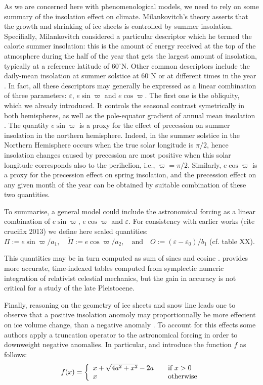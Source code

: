 \documentclass[a4paper,12pt]{article}
\newcommand{\degree}{\ensuremath{{}^\circ}}
\begin{document}
As we are concerned here with phenomenological models, we need to rely on some summary of the insolation effect on climate.
Milankovitch's theory asserts that the growth and shrinking of ice sheets is controlled by summer insolation.
Specifially, Milankovitch considered a particular descriptor which he termed the caloric summer insolation: this is
the amount of energy received at the top of the atmosphere during the half of the year that gets the largest amount of insolation, typically
at a reference latitude of 60\degree N. Other common descriptors include the daily-mean insolation at summer solstice at 60$\degree$N \cite{imbrie80}
or at different times in the year \cite{salzman90sm}. In fact, all these descriptors may generally be expressed as a linear combination of three parameters: 
$\varepsilon$, $e\sin\varpi$ and $e\cos\varpi$. The first one is the obliquity, which we already introduced. It  controls the seasonal contrast symetrically
in both hemispheres, as well as the pole-equator gradient of annual mean insolation \cite{Loutrexx}. 
The quantity $e\sin\varpi$ is a proxy for the effect of precession on summer insolation in the northern hemisphere. Indeed, 
in the summer solstice in the Northern Hemisphere occurs when the true solar longitude is $\pi/2$, hence insolation changes caused by precession
are most positive when this solar longitude corresponds also to the perihelion, i.e., $\varpi = \pi/2$. Similarly, $e\cos\varpi$ is a proxy
for the precession effect on spring insolation, and the precession effect on any given month of the year can be obtained by suitable combination
of these two quantities. 

To summarise, a general model could include the astronomical forcing as a linear combination of $e\sin\varpi$, $e\cos\varpi$ and $\varepsilon$. 
For consistency with earlier works (cite crucifix 2013) we define here scaled quantities: 
$\Pi := e\sin \varpi / a_1,\quad \tilde{\Pi} := e\cos \varpi / a_2,\quad\mathrm{and}\quad O := (\varepsilon - \varepsilon_0)/b_1$ (cf. table XX). 

This quantities may be in turn computed as sum of sines and cosine \cite{Berger1978a}. \cite{Laskar04aa} provides more accurate, time-indexed tables
computed from symplectic numeric integration of relativist celestial mechanics, but the gain in accuracy is not critical for a study of the late Pleistocene.

Finally, reasoning on the geometry of ice sheets and snow line leads one to observe that a positive insolation anomoly may proportionnally be more effecient 
on ice volume change, than a negative anomaly \cite{oerlemansXX, ruddiman06}. To account for this effects 
some authors apply a truncation operator to the astronomical forcing in order to downweight
negative anomalies. In particular, \cite{paillard98} and \cite{Parrenin12ab} introduce the function $f$ as follows:
\[ f(x) = \left\{
  \begin{array}{l l}
    x + \sqrt{4a^2 + x^2} - 2a & \quad \text{if $x > 0$}\\
    x & \quad \text{otherwise}
  \end{array} \right.
\]
 
\end{document}
